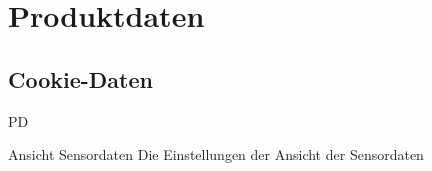 \section{Produktdaten}

\subsection{Cookie-Daten}
\begin{Kriterien}{PD}
    \item Ansicht Sensordaten
        Die Einstellungen der Ansicht der Sensordaten
\end{Kriterien}
